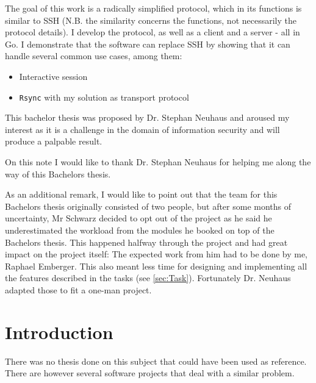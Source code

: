 \documentclass[10pt,a4paper,titlepage,twoside,english,final]{zhawreprt}
\begin{document}
The goal of this work is a radically simplified protocol, which in its functions is similar to \gls{SSH} (N.B. the similarity concerns the functions, not necessarily the protocol details).
I develop the protocol, as well as a client and a server - all in \gls{Go}.
I demonstrate that the software can replace \gls{SSH} by showing that it can handle several common use cases, among them:

\begin{itemize}
\item Interactive session
\item \texttt{Rsync} with my solution as transport protocol
\end{itemize}

This bachelor thesis was proposed by Dr. Stephan Neuhaus \citep{BA19_neut_03} and aroused my interest as it is a challenge in the domain of information security and will produce a palpable result.

On this note I would like to thank Dr. Stephan Neuhaus for helping me along the way of this Bachelors thesis.

As an additional remark, I would like to point out that the team for this Bachelors thesis originally consisted of two people, but after some months of uncertainty, Mr Schwarz decided to opt out of the project as he said he underestimated the workload from the modules he booked on top of the Bachelors thesis.
This happened halfway through the project and had great impact on the project itself:
The expected work from him had to be done by me, Raphael Emberger.
This also meant less time for designing and implementing all the features described in the tasks (see \ref{sec:Task}).
Fortunately Dr. Neuhaus adapted those to fit a one-man project.

\makedeclarationoforiginality

\tableofcontents


\chapter{Introduction}\label{chp:Introduction}
There was no thesis done on this subject that could have been used as reference.
There are however several software projects that deal with a similar problem.
\end{document}
